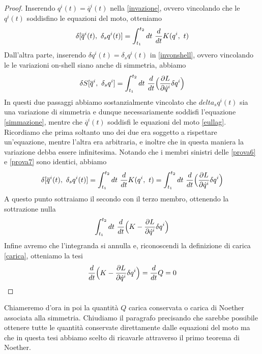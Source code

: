 \begin{proof}
    Inserendo $q^i(t) = \overline q^i(t)$ nella \eqref{invazione}, ovvero vincolando che le $q^i(t)$ soddisfino le equazioni del moto, otteniamo 
\begin{equation}\label{prova6}
    \delta[\overline q^i(t), ~\delta_s q^i(t)] = \int_{t_1}^{t_2}dt~ \frac{d}{dt} K(q^i, ~t)
\end{equation}
    Dall'altra parte, inserendo $\delta q^i(t) = \delta_s q^i(t)$ in \eqref{invonshell}, ovvero vincolando le le variazioni on-shell siano anche di simmetria, abbiamo
\begin{equation}\label{prova7}
    \delta S[\overline q^i,~\delta_s q^i] = \int_{t_1}^{t_2}dt~ \frac{d}{dt} \Big( \frac{\partial L}{\partial\dot q^i} \delta q^i \Big )
\end{equation}
    In questi due passaggi abbiamo sostanzialmente vincolato che $delta_s q^i(t)$ sia una variazione di simmetria e dunque necessariamente soddisfi l'equazione \eqref{simmazione}, mentre che $\overline q^i(t)$ soddisfi le equazioni del moto \eqref{eullag}. Ricordiamo che prima soltanto uno dei due era soggetto a rispettare un'equazione, mentre l'altra era arbitraria, e inoltre che in questa maniera la variazione debba essere infinitesima. Notando che i membri sinistri delle \eqref{prova6} e \eqref{prova7} sono identici, abbiamo
\begin{equation}
    \delta[\overline q^i(t), ~\delta_s q^i(t)] = \int_{t_1}^{t_2}dt~ \frac{d}{dt} K(q^i, ~t) = \int_{t_1}^{t_2}dt~ \frac{d}{dt} \Big( \frac{\partial L}{\partial\dot q^i} \delta q^i \Big )
\end{equation}
    A questo punto sottraiamo il secondo con il terzo membro, ottenendo la sottrazione nulla
\begin{equation}
    \int_{t_1}^{t_2}dt~ \frac{d}{dt} \Big (K - \frac{\partial L}{\partial\dot q^i} \delta q^i \Big )
\end{equation}
    Infine avremo che l'integranda si annulla e, riconoscendi la definizione di carica \eqref{carica}, otteniamo la tesi
\begin{equation}
    \frac{d}{dt} \Big (K - \frac{\partial L}{\partial\dot q^i} \delta q^i \Big ) = \frac{d}{dt} Q = 0
\end{equation}
\end{proof}
    Chiameremo d'ora in poi la quantità $Q$ carica conservata o carica di Noether associata alla simmetria. Chiudiamo il paragrafo precisando che sarebbe possibile ottenere tutte le quantità conservate direttamente dalle equazioni del moto ma che in questa tesi abbiamo scelto di ricavarle attraverso il primo teorema di Noether. 


